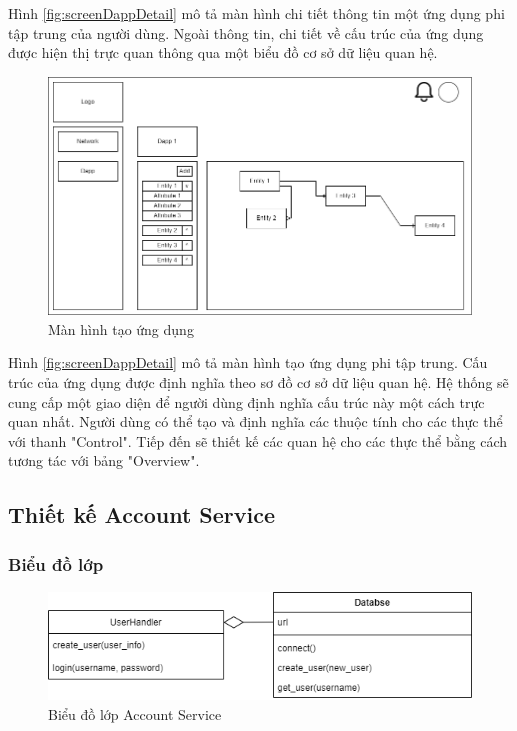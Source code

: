 \documentclass[../DoAn.tex]{subfiles}
\begin{document}
Hình \ref{fig:screenDappDetail} mô tả màn hình chi tiết thông tin một ứng dụng
phi tập trung của người dùng. Ngoài thông tin, chi tiết về cấu trúc của ứng
dụng được hiện thị trực quan thông qua một biểu đồ cơ sở dữ liệu quan hệ.

\begin{figure}[H]
    \centering
    \includegraphics[width=0.75\linewidth]{Hinhve/DoAn-ScreenDappCreate.drawio.png}
    \caption{Màn hình tạo ứng dụng}
    \label{fig:screenDappCreate}
\end{figure}

Hình \ref{fig:screenDappDetail} mô tả màn hình tạo ứng dụng phi tập trung. Cấu
trúc của ứng dụng được định nghĩa theo sơ đồ cơ sở dữ liệu quan hệ. Hệ thống sẽ
cung cấp một giao diện để người dùng định nghĩa cấu trúc này một cách trực quan
nhất. Người dùng có thể tạo và định nghĩa các thuộc tính cho các thực thể với
thanh "Control". Tiếp đến sẽ thiết kế các quan hệ cho các thực thể bằng cách
tương tác với bảng "Overview".

\subsection{Thiết kế Account Service}

\subsubsection{Biểu đồ lớp}

\begin{figure}[H]
    \centering
    \includegraphics[width=0.75\linewidth]{Hinhve/DoAn-ClassAccountService.drawio.png}
    \caption{Biểu đồ lớp Account Service}
    \label{fig:classAccountService}
\end{figure}
\end{document}
